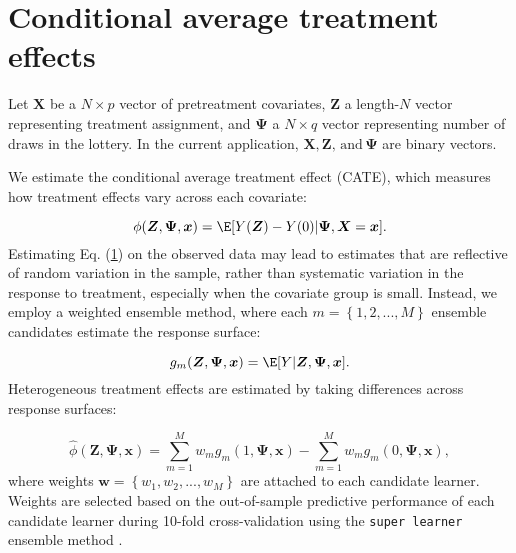 {\color{red}
\section{Conditional average treatment effects}  \label{cate}
}

Let $\boldsymbol{X}$ be a $N \times p$ vector of pretreatment covariates, $\boldsymbol{Z}$ a length-$N$ vector representing treatment assignment, and $\boldsymbol{\Psi}$ a $N \times q$ vector representing number of draws in the lottery. In the current application, $\boldsymbol{X}, \boldsymbol{Z}, \mathrm{\, and\,} \boldsymbol{\Psi}$ are binary vectors. 

We estimate the conditional average treatment effect (CATE), which measures how treatment effects vary across each covariate:

\begin{equation} \label{cate}
	\phi (\boldsymbol{Z}, \boldsymbol{\Psi}, \boldsymbol{x}) = \E[Y(\boldsymbol{Z}) - Y(0) | \boldsymbol{\Psi}, \boldsymbol{X} = \boldsymbol{x}].
\end{equation} Estimating Eq. (\ref{cate}) on the observed data may lead to estimates that are reflective of random variation in the sample, rather than systematic variation in the response to treatment, especially when the covariate group is small. Instead, we employ a weighted ensemble method, where each $m = \left\{1, 2, ..., M\right\}$ ensemble candidates estimate the response surface:

\begin{equation} \label{r-surface}
	g_m (\boldsymbol{Z}, \boldsymbol{\Psi}, \boldsymbol{x}) = \E[Y | \boldsymbol{Z}, \boldsymbol{\Psi}, \boldsymbol{x}].
\end{equation} Heterogeneous treatment effects are estimated by taking differences across response surfaces:

\begin{equation} \label{cate-hat}
	\hat{\phi} (\boldsymbol{Z}, \boldsymbol{\Psi}, \boldsymbol{x}) = 
	\sum^{M}_{m=1} w_m g_m (1, \boldsymbol{\Psi}, \boldsymbol{x}) - 
	\sum^{M}_{m=1} w_m g_m (0, \boldsymbol{\Psi}, \boldsymbol{x}), 
\end{equation} where weights $\boldsymbol{w} = \left\{w_1, w_2, ..., w_M\right\}$ are attached to each candidate learner. Weights are selected based on the out-of-sample predictive performance of each candidate learner during 10-fold cross-validation using the \texttt{super learner} ensemble method \citep{van2007}. 
